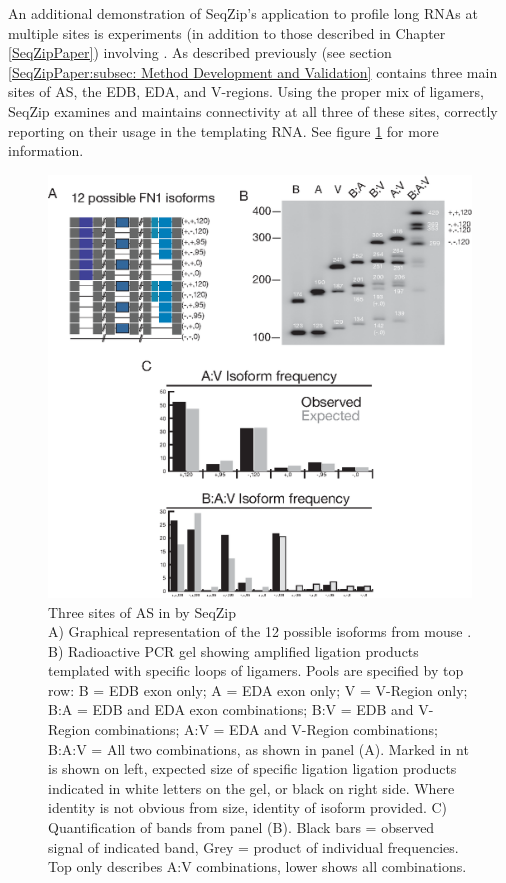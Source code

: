     An additional demonstration of SeqZip's application to profile long RNAs at multiple sites is experiments (in addition to those described in Chapter \ref{SeqZipPaper}) involving \fn{}. As described previously (see section \ref{SeqZipPaper:subsec: Method Development and Validation} \fn{} contains three main sites of AS, the EDB, EDA, and V-regions. Using the proper mix of ligamers, SeqZip examines and maintains connectivity at all three of these sites, correctly reporting on their usage in the templating RNA. See figure \ref{SeqZipMethod:fig:Three Site FN1 by SeqZip} for more information.

    \begin{figure} %
            \centering 
            \includegraphics{Figures/SeqZipMethod/fn1ThreeSite.eps}
            \caption[Three sites of AS in \fn{} by SeqZip]
            {
              Three sites of AS in \fn{} by SeqZip\\[0.25cm]
              A) Graphical representation of the 12 possible isoforms from mouse \fn{}. B) Radioactive PCR gel showing amplified ligation products templated with specific loops of ligamers. Pools are specified by top row: B = EDB exon only; A = EDA exon only; V = V-Region only; B:A = EDB and EDA exon combinations; B:V = EDB and V-Region combinations; A:V = EDA and V-Region combinations; B:A:V = All two combinations, as shown in panel (A). Marked in nt is shown on left, expected size of specific ligation ligation products indicated in white letters on the gel, or black on right side. Where identity is not obvious from size, identity of isoform provided. C) Quantification of bands from panel (B). Black bars = observed signal of indicated band, Grey = product of individual frequencies. Top only describes A:V combinations, lower shows all combinations.
              }
            \label{SeqZipMethod:fig:Three Site FN1 by SeqZip}
            \end{figure}

